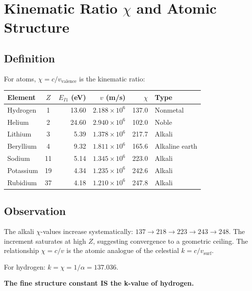 \section{Kinematic Ratio $\chi$ and Atomic Structure}

\subsection{Definition}

For atoms, $\chi = c/v_{\text{valence}}$ is the kinematic ratio:

\begin{center}
\begin{tabular}{lcrrrl}
\hline
\textbf{Element} & $Z$ & $E_{I1}$ (eV) & $v$ (m/s) & $\chi$ & \textbf{Type} \\
\hline
Hydrogen  &  1 & 13.60 & $2.188 \times 10^6$ & 137.0 & Nonmetal \\
Helium    &  2 & 24.60 & $2.940 \times 10^6$ & 102.0 & Noble \\
Lithium   &  3 &  5.39 & $1.378 \times 10^6$ & 217.7 & Alkali \\
Beryllium &  4 &  9.32 & $1.811 \times 10^6$ & 165.6 & Alkaline earth \\
Sodium    & 11 &  5.14 & $1.345 \times 10^6$ & 223.0 & Alkali \\
Potassium & 19 &  4.34 & $1.235 \times 10^6$ & 242.6 & Alkali \\
Rubidium  & 37 &  4.18 & $1.210 \times 10^6$ & 247.8 & Alkali \\
\hline
\end{tabular}
\end{center}

\subsection{Observation}

The alkali $\chi$-values increase systematically: $137 \to 218 \to 223 \to 243 \to 248$.  The increment saturates at high $Z$, suggesting convergence to a geometric ceiling.  The relationship $\chi = c/v$ is the atomic analogue of the celestial $k = c/v_{\text{surf}}$.

For hydrogen: $k = \chi = 1/\alpha = 137.036$.

\textbf{The fine structure constant IS the k-value of hydrogen.}


